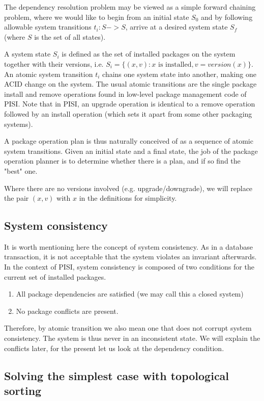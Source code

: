 \documentclass[a4paper,11pt]{article}
\begin{document}
The dependency resolution problem may be viewed as a simple forward
chaining problem, where we would like to begin from an initial state
$S_0$ and by following allowable system transitions $t_i: S -> S$, 
arrive at a desired system state $S_f$ (where $S$ is the set of all states).

A system state $S_i$ is defined as the set of installed packages on the
system together with their versions, i.e. $S_i = \{  (x,v) : x \text{ is
installed}, v=version(x)\} $. An atomic system transition $t_i$ chains one
system state into another, making one ACID change on the system. The
usual atomic transitions are the single package install and remove 
operations found in low-level package management code of PISI. Note
that in PISI, an upgrade operation is identical to a remove operation
followed by an install operation (which sets it apart from some other
packaging systems).

A package operation plan is thus naturally conceived of as a sequence
of atomic system transitions. Given an initial state and a final
state, the job of the package operation planner is to determine
whether there is a plan, and if so find the "best" one.

Where there are no versions involved (e.g. upgrade/downgrade), we will
replace the pair $(x,v)$ with $x$ in the definitions for simplicity.

\subsection{System consistency}

It is worth mentioning here the concept of system consistency. As in a
database transaction, it is not acceptable that the system violates an
invariant afterwards. In the context of PISI, system consistency is
composed of two conditions for the current set of installed packages.
\begin{enumerate}
\item All package dependencies are satisfied (we may call this a
  closed system)
\item No package conflicts are present. 
\end{enumerate}

Therefore, by atomic transition we also mean one that does not corrupt
system consistency. The system is thus never in an inconsistent
state. We will explain the conflicts later, for the present let us
look at the dependency condition.

\subsection{Solving the simplest case with topological sorting}
\end{document}
